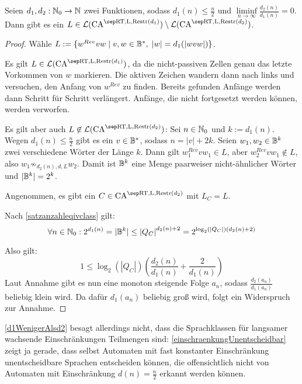 \begin{satz}
    \label{d1WenigerAlsd2}
    Seien $d_1, d_2: \mathbb{N}_0 \to \mathbb{N}$ zwei Funktionen, sodass $d_1(n) \leq \frac{n}{2}$ und $\liminf\limits_{n \rightarrow \infty} \frac{d_2(n)}{d_1(n)} = 0$.
    Dann gibt es ein $L \in \CAL{\CART, \CALeft, \CARestr(d_1)} \setminus \CAL{\CART, \CALeft, \CARestr(d_2)}$.
\end{satz}
\begin{proof}
    Wähle $L := \{ { w^{Rev}vw } \; | \; { v, w \in \mathbb{B}^*, \; |w| = d_1(|wvw|) } \}$.
    
    Es gilt $L \in \CAL{\CART, \CALeft, \CARestr(d_1)}$, da die nicht-passiven Zellen genau das letzte Vorkommen von $w$ markieren.
    Die aktiven Zeichen wandern dann nach links und versuchen, den Anfang von $w^{Rev}$ zu finden.
    Bereits gefunden Anfänge werden dann Schritt für Schritt verlängert. Anfänge, die nicht fortgesetzt werden können, werden verworfen.

    Es gilt aber auch $L \not\in \CAL{\CART, \CALeft, \CARestr(d_2)}$:
    Sei $n \in \mathbb{N}_0$ und $k := d_1(n)$. Wegen $d_1(n) \leq \frac{n}{2}$ gibt es ein $v \in \mathbb{B}^*$, sodass $n = |v| + 2k$.
    Seien $w_1, w_2 \in \mathbb{B}^k$ zwei verschiedene Wörter der Länge $k$.
    Dann gilt $w_1^{Rev}vw_1 \in L$, aber $w_2^{Rev}vw_1 \not\in L$, also $w_1 \not\sim_{d_2(n),d,L} w_2$.
    Damit ist $\mathbb{B}^k$ eine Menge paarweiser nicht-ähnlicher Wörter und $|\mathbb{B}^k| = 2^k$.
    
    Angenommen, es gibt ein $C \in \CAM{\CART, \CALeft, \CARestr(d_2)}$ mit $L_C = L$.
    
    Nach \cref{satzanzahleqivclass} gilt:
    \[
        \forall n \in \mathbb{N}_0:  2^{d_1(n)} = |\mathbb{B}^k| \leq {|Q_C|}^{d_2(n)+2} = 2^{\log_2(|Q_C|)(d_2(n)+2)}
    \]
    
    Also gilt: 
    \[
        1 \leq \log_2(|Q_C|) ( \frac{ d_2(n) }{ d_1(n) } + \frac{ 2 }{ d_1(n) })
    \]
    Laut Annahme gibt es nun eine monoton steigende Folge $a_n$, sodass $\frac{d_2(a_n)}{d_1(a_n)}$ beliebig klein wird.
    Da dafür $d_1(a_n)$ beliebig groß wird, folgt ein Widerspruch zur Annahme.
\end{proof}

\begin{remark}
    \cref{d1WenigerAlsd2} besagt allerdings nicht, dass die Sprachklassen für langsamer wachsende Einschränkungen Teilmengen sind:
    \cref{einschraenkungUnentscheidbar} zeigt ja gerade, dass selbst Automaten mit fast konstanter Einschränkung
    unentscheidbare Sprachen entscheiden können, die offensichtlich nicht von Automaten mit Einschränkung $d(n) = \frac{n}{2}$ erkannt werden können.
\end{remark}



